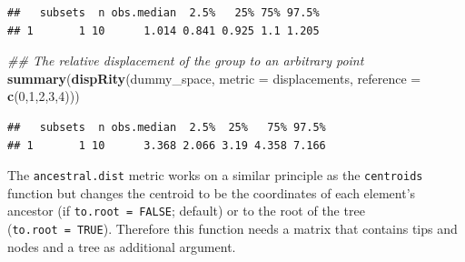 \documentclass[
]{book}
\newenvironment{Shaded}{\begin{snugshade}}{\end{snugshade}}
\newcommand{\CommentTok}[1]{\textcolor[rgb]{0.56,0.35,0.01}{\textit{#1}}}
\newcommand{\DataTypeTok}[1]{\textcolor[rgb]{0.13,0.29,0.53}{#1}}
\newcommand{\DecValTok}[1]{\textcolor[rgb]{0.00,0.00,0.81}{#1}}
\newcommand{\KeywordTok}[1]{\textcolor[rgb]{0.13,0.29,0.53}{\textbf{#1}}}
\newcommand{\NormalTok}[1]{#1}
\newcommand{\OperatorTok}[1]{\textcolor[rgb]{0.81,0.36,0.00}{\textbf{#1}}}
\newcommand{\StringTok}[1]{\textcolor[rgb]{0.31,0.60,0.02}{#1}}
\begin{document}
\begin{verbatim}
##   subsets  n obs.median  2.5%   25% 75% 97.5%
## 1       1 10      1.014 0.841 0.925 1.1 1.205
\end{verbatim}

\begin{Shaded}
\begin{Highlighting}[]
\CommentTok{\#\# The relative displacement of the group to an arbitrary point}
\KeywordTok{summary}\NormalTok{(}\KeywordTok{dispRity}\NormalTok{(dummy\_space, }\DataTypeTok{metric =}\NormalTok{ displacements,}
                 \DataTypeTok{reference =} \KeywordTok{c}\NormalTok{(}\DecValTok{0}\NormalTok{,}\DecValTok{1}\NormalTok{,}\DecValTok{2}\NormalTok{,}\DecValTok{3}\NormalTok{,}\DecValTok{4}\NormalTok{)))}
\end{Highlighting}
\end{Shaded}

\begin{verbatim}
##   subsets  n obs.median  2.5%  25%   75% 97.5%
## 1       1 10      3.368 2.066 3.19 4.358 7.166
\end{verbatim}

The \texttt{ancestral.dist} metric works on a similar principle as the \texttt{centroids} function but changes the centroid to be the coordinates of each element's ancestor (if \texttt{to.root\ =\ FALSE}; default) or to the root of the tree (\texttt{to.root\ =\ TRUE}).
Therefore this function needs a matrix that contains tips and nodes and a tree as additional argument.

\begin{Shaded}
\end{Shaded}
\end{document}
